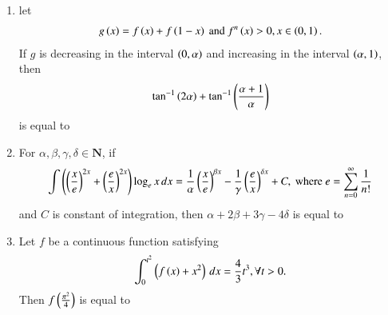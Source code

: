\documentclass[journal]{IEEEtran}
\numberwithin{equation}{enumi}
\numberwithin{figure}{enumi}
\begin{document}
\begin{enumerate}
    \item 
    let 
    \begin{align*}
        g\left(x\right) = f\left(x\right) + f\left(1 - x\right) \text{ and } f^n\left(x\right) > 0, x \in \left(0, 1\right).
    \end{align*}
    If $g$ is decreasing in the interval $\left(0, \alpha\right)$ and increasing in the interval $\left(\alpha, 1\right)$, then 
    \begin{align*}
        \tan^{-1} {\left(2\alpha\right)} + \tan^{-1} {\left(\frac{\alpha + 1}{\alpha}\right)}
    \end{align*}
    is equal to

    \hfill{}

    \begin{enumerate}
    \end{enumerate}

    \item 
    For $\alpha, \beta, \gamma, \delta \in \mathbf{N}$, if
    \begin{align*}
         \int \left(\left(\frac{x}{e}\right)^{2x} + \left(\frac{e}{x}\right)^{2x}\right) \log_ex \, dx = \frac{1}{\alpha}\left(\frac{x}{e}\right)^{\beta x} - \frac{1}{\gamma}\left(\frac{e}{x}\right)^{\delta x} + C, \text{ where } e = \sum_{n = 0}^\infty \frac{1}{n!}
    \end{align*}
    and $C$ is constant of integration, then $\alpha + 2\beta + 3\gamma - 4\delta$ is equal to

    \hfill{}

    \begin{enumerate}
    \end{enumerate}

    \item 
    Let $f$ be a continuous function satisfying
    \begin{align*}
        \int_0^{t^2} \left(f\left(x\right) + x^2\right) \, dx = \frac{4}{3}t^3, \forall t > 0. 
    \end{align*}
    Then $f\left(\frac{\pi^2}{4}\right)$ is equal to


\end{enumerate}
\end{document}
